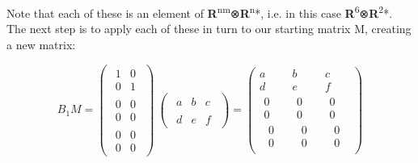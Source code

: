 \documentclass[oneside,english]{amsbook}
\numberwithin{section}{chapter}
\theoremstyle{plain}
\theoremstyle{definition}
\begin{document}
Note that each of these is an element of
\textbf{R}\textsuperscript{nm}⊗\textbf{R}\textsuperscript{n}*, i.e. in
this case \textbf{R}\textsuperscript{6}⊗\textbf{R}\textsuperscript{2}*.
The next step is to apply each of these in turn to our starting matrix
M, creating a new matrix:

\[B_{1}M = \begin{pmatrix}
	\begin{matrix}
		1 & 0 \\
		0 & 1
	\end{matrix} \\
	\begin{matrix}
		0 & 0 \\
		0 & 0
	\end{matrix} \\
	\begin{matrix}
		0 & 0 \\
		0 & 0
	\end{matrix}
\end{pmatrix}\ \begin{pmatrix}
	\begin{matrix}
		a & b & c
	\end{matrix} \\
	\begin{matrix}
		d & e & f
	\end{matrix}
\end{pmatrix} = \begin{pmatrix}
	a & b & c \\
	d & e & f \\
	\begin{matrix}
		0 \\
		0 \\
		\begin{matrix}
			0 \\
			0
		\end{matrix}
	\end{matrix} & \begin{matrix}
		0 \\
		0 \\
		\begin{matrix}
			0 \\
			0
		\end{matrix}
	\end{matrix} & \begin{matrix}
		0 \\
		0 \\
		\begin{matrix}
			0 \\
			0
		\end{matrix}
	\end{matrix}
\end{pmatrix}\]
\end{document}
